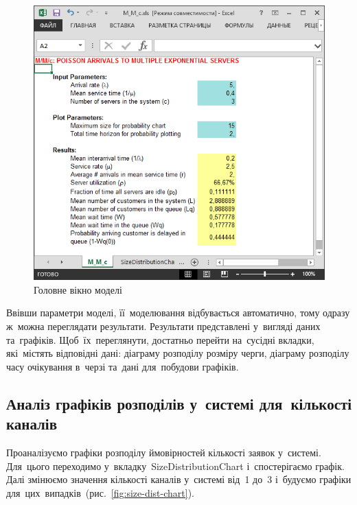 \documentclass[
  a4paper,
  oneside,
  BCOR = 10mm,
  DIV = 12,
  12pt,
  headings = normal,
]{scrartcl}
\newlength{\gridunitwidth}
\begin{document}
      \begin{figure}[!htbp]
        \centering
        \includegraphics[width = 9\gridunitwidth]{./assets/00-02.png}
        \caption{Головне вікно моделі}
        \label{fig:setup-model}
      \end{figure}

      Ввівши параметри моделі, її~моделювання відбувається автоматично, тому одразу ж~можна переглядати результати. Результати представлені у~вигляді даних та~графіків. Щоб~їх~переглянути, достатньо перейти на~сусідні вкладки, які~містять відповідні дані: діаграму розподілу розміру черги, діаграму розподілу часу очікування в~черзі та~дані для~побудови графіків.

    \subsection{Аналіз графіків розподілів у~системі для~кількості каналів}
      Проаналізуємо графіки розподілу ймовірностей кількості заявок у~системі. Для~цього переходимо у~вкладку~\textenglish{SizeDistributionChart} і~спостерігаємо графік. Далі змінюємо значення кількості каналів у~системі від~1 до~3 і~будуємо графіки для~цих~випадків~(рис.~\ref{fig:size-dist-chart}).
\end{document}
